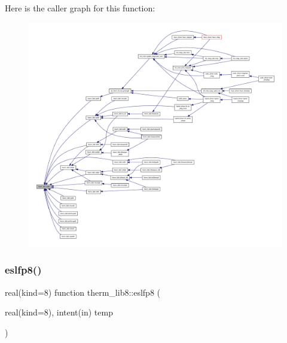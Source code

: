 Here is the caller graph for this function\+:
\nopagebreak
\begin{figure}[H]
\begin{center}
\leavevmode
\includegraphics[width=350pt]{namespacetherm__lib8_aa7a527bdf772238306801f7f86e6db58_icgraph}
\end{center}
\end{figure}
\mbox{\label{namespacetherm__lib8_a3f44aca95e1fb010823bb94ede3d19ca}} 
\subsubsection{\texorpdfstring{eslfp8()}{eslfp8()}}
{\footnotesize\ttfamily real(kind=8) function therm\+\_\+lib8\+::eslfp8 (\begin{DoxyParamCaption}\item[{real(kind=8), intent(in)}]{temp }\end{DoxyParamCaption})}

